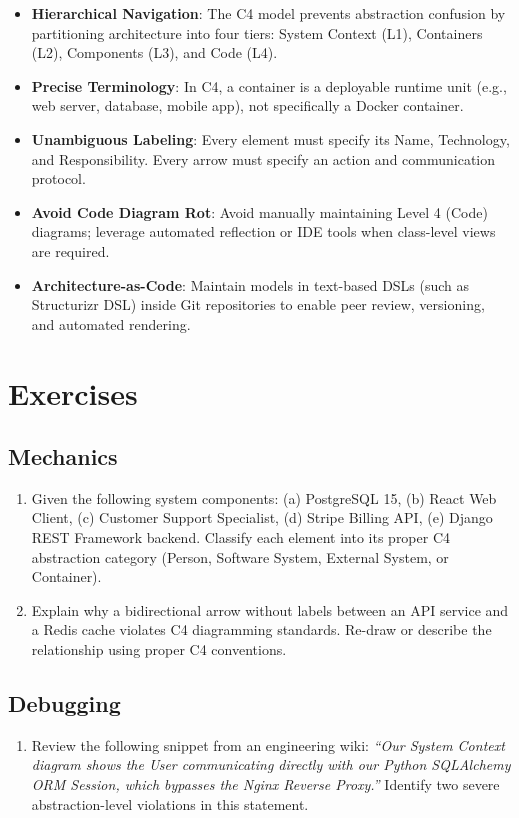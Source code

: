 \begin{itemize}[leftmargin=18pt]
  \item \textbf{Hierarchical Navigation}: The C4 model prevents abstraction confusion by partitioning architecture into four tiers: System Context (L1), Containers (L2), Components (L3), and Code (L4).
  \item \textbf{Precise Terminology}: In C4, a container is a deployable runtime unit (e.g., web server, database, mobile app), not specifically a Docker container.
  \item \textbf{Unambiguous Labeling}: Every element must specify its Name, Technology, and Responsibility. Every arrow must specify an action and communication protocol.
  \item \textbf{Avoid Code Diagram Rot}: Avoid manually maintaining Level 4 (Code) diagrams; leverage automated reflection or IDE tools when class-level views are required.
  \item \textbf{Architecture-as-Code}: Maintain models in text-based DSLs (such as Structurizr DSL) inside Git repositories to enable peer review, versioning, and automated rendering.
\end{itemize}

\section{Exercises}

\subsection*{Mechanics}
\begin{enumerate}[leftmargin=18pt]
  \item Given the following system components: (a) PostgreSQL 15, (b) React Web Client, (c) Customer Support Specialist, (d) Stripe Billing API, (e) Django REST Framework backend. Classify each element into its proper C4 abstraction category (Person, Software System, External System, or Container).
  \item Explain why a bidirectional arrow without labels between an API service and a Redis cache violates C4 diagramming standards. Re-draw or describe the relationship using proper C4 conventions.
\end{enumerate}

\subsection*{Debugging}
\begin{enumerate}[leftmargin=18pt]
  \item Review the following snippet from an engineering wiki: \textit{``Our System Context diagram shows the User communicating directly with our Python SQLAlchemy ORM Session, which bypasses the Nginx Reverse Proxy.''} Identify two severe abstraction-level violations in this statement.
\end{enumerate}

